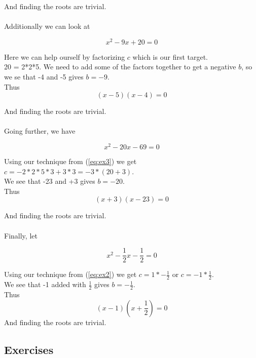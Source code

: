 \documentclass[a4paper]{article}
\begin{document}
And finding the roots are trivial.\\ \\
Additionally we can look at

\begin{equation}  \label{eq:ex3}
	x^2 - 9x + 20 = 0
\end{equation}

Here we can help ourself by factorizing $c$ which is our first target.\\ 20 = 2*2*5. We need to add some of the factors together to get a negative $b$, so we se that -4 and -5 gives $b=-9$.\\ Thus
\begin{equation} \label{eq:ex31}
 (x-5)(x-4) = 0
\end{equation}

And finding the roots are trivial.\\ \\
Going further, we have

\begin{equation}  \label{eq:ex4}
	x^2 - 20x - 69 = 0
\end{equation}

Using our technique from (\ref{eq:ex3}) we get $c=-2*2*5*3+3*3 = -3*(20+3)$.\\ We see that -23 and +3 gives $b=-20$.\\ 
Thus
\begin{equation} \label{eq:ex41}
 (x+3)(x-23) = 0
\end{equation}

And finding the roots are trivial.\\ \\
Finally, let

\begin{equation}  \label{eq:ex5}
	x^2 - \frac{1}{2}x - \frac{1}{2} = 0
\end{equation}

Using our technique from (\ref{eq:ex2}) we get $c=1*- \frac{1}{2}$ or $c= -1*\frac{1}{2}$.\\ We see that -1 added with $\frac{1}{2}$ gives $b=-\frac{1}{2}$.\\ 
Thus
\begin{equation} \label{eq:ex51}
 (x-1)(x+\frac{1}{2}) = 0
\end{equation}
And finding the roots are trivial.

\newpage

\subsection{Exercises}
\end{document}
